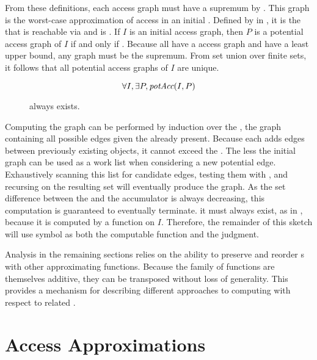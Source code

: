 From these definitions, each access graph must have a supremum by \NMpotTransfer{}.
This \term{\TMpotAcc} graph is the worst-case approximation of access in an initial \TMaccessGraph{}.
Defined by \NMpotAcc{} in , it is the \TMaccessGraph{} that is reachable via \NMpotTransfer{} and is \NMmaximal{}.
If \(I\) is an initial access graph, then \(P\) is a potential access graph of \(I\) if and only if .
Because all \TMaccessGraphs{} have a \TMmaximal{} access graph and have a least upper bound, any \TMpotAcc{} graph must be the supremum.
From set union over finite sets, it follows that all potential access graphs of \(I\) are unique.

\begin{figure}
  \[\forall I, \exists P, \textit{potAcc}(I,P) \]
  \caption{\xmakefirstuc{\TMpotAcc} always exists. \label{fig:sketch:computePotAcc}}
\end{figure}

Computing the \TMpotAcc{} graph can be performed by induction over the \term{\TMcompleteAG}, the graph containing all possible edges given the \TMrefs{} already present.
Because each \TMtransfer{} adds edges between previously existing objects, it cannot exceed the \TMcompleteAG{}.
The \TMcompleteAG{} less the initial graph can be used as a work list when considering a new potential edge.
Exhaustively scanning this list for candidate edges, testing them with \TMtransfer{}, and recursing on the resulting set will eventually produce the \TMpotAcc{} graph.
As the set difference between the \TMcompleteAG{} and the accumulator is always decreasing, this computation is guaranteed to eventually terminate.
\TMpotAcc{} it must always exist, as in , because it is computed by a function on \(I\).
Therefore, the remainder of this sketch will use symbol \NMpotAcc{} as both the computable function and the judgment.


Analysis in the remaining sections relies on the ability to preserve and reorder \NMtransfer{}s with other approximating functions.
Because the family of \NMtransfer{} functions are themselves additive, they can be transposed without loss of generality.
This provides a mechanism for describing different approaches to computing \TMpotAcc{} with respect to related \TMaccessGraphs{}.

\section{Access Approximations}

